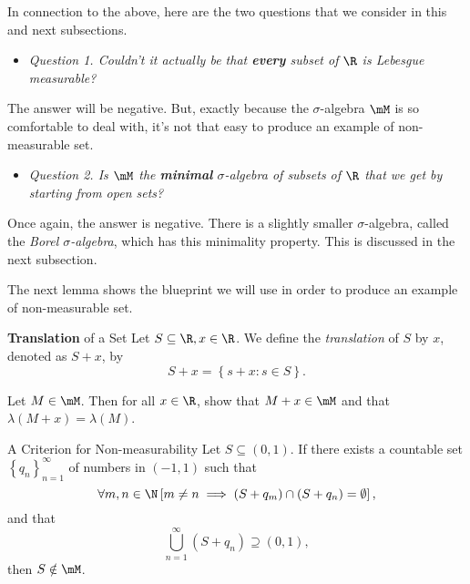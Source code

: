 \documentclass[pmath450]{subfiles}
\begin{document}
    In connection to the above, here are the two questions that we consider in this and next subsections.

    \begin{itemize}
        \item \textit{Question 1. Couldn't it actually be that \textbf{every} subset of $\R$ is Lebesgue measurable?}
    \end{itemize} 
    The answer will be negative. But, exactly because the $\sigma$-algebra $\mM$ is so comfortable to deal with, it's not that easy to produce an example of non-measurable set. 
    \begin{itemize}
        \item \textit{Question 2. Is $\mM$ the \textbf{minimal} $\sigma$-algebra of subsets of $\R$ that we get by starting from open sets?}
    \end{itemize} 
    Once again, the answer is negative. There is a slightly smaller $\sigma$-algebra, called the \textit{Borel $\sigma$-algebra}, which has this minimality property. This is discussed in the next subsection.

    \np The next lemma shows the blueprint we will use in order to produce an example of non-measurable set. 

    \begin{definition}{\textbf{Translation} of a Set}
        Let $S\subseteq\R, x\in\R$. We define the \emph{translation} of $S$ by $x$, denoted as $S+x$, by
        \begin{equation*}
            S+x = \left\lbrace s+x: s\in S \right\rbrace.
        \end{equation*}
    \end{definition}

    \begin{exercise}{}
        Let $M\in\mM$. Then for all $x\in\R$, show that $M+x\in\mM$ and that $\lambda\left( M+x \right)=\lambda\left( M \right)$.
    \end{exercise}

    \placeqed[Assignment]

    \begin{lemma}{A Criterion for Non-measurability}
        Let $S\subseteq\left( 0,1 \right)$. If there exists a countable set $\left\lbrace q_n \right\rbrace^{\infty}_{n=1}$ of numbers in $\left( -1,1 \right)$ such that
        \begin{equation}
            \forall m,n\in\N\left[ m\neq n\implies \left( S+q_m \right)\cap \left( S+q_n \right)=\emptyset \right],
        \end{equation}
        and that
        \begin{equation}
            \bigcup^{\infty}_{n=1}\left( S+q_n \right)\supseteq\left( 0,1 \right),
        \end{equation}
        then $S\notin\mM$.
    \end{lemma}
\end{document}
